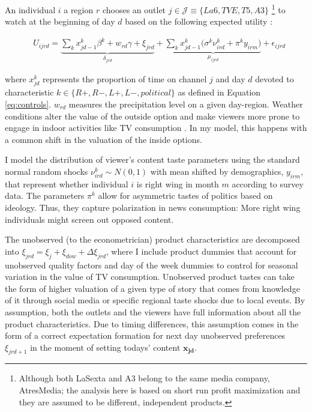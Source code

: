 \documentclass[12pt]{article}
\begin{document}
	An individual $ i $  a region $r$ chooses an outlet $ j \in \mathcal{J}\equiv \{La6,TVE,T5,A3\}$ \footnote{Although both LaSexta and A3 belong to the same media company, AtresMedia; the analysis here is based on short run profit maximization and they are assumed to be different, independent products. } to watch at the beginning of day $d$ based on the following expected utility : 
	
	
	\begin{equation}\label{eq:utility}
		\begin{aligned}
			& U_{ijrd}= \underbrace{\sum_k x_{jd-1}^k\beta^k+w_{rd}   \gamma  +  \xi_{jrd}}_{\delta_{jrd}}  + \underbrace{  \sum_k x_{jd-1}^k \Big( \sigma^k \nu_{ird}^k  + \pi^ky_{irm} \Big)}_{\mu_{ijrd}}+\epsilon_{ijrd} 
		\end{aligned}
	\end{equation} 
	
	where $ x_{jd}^k $ represents the  proportion of time on channel $ j $ and day $ d$ devoted to characteristic $ k \in \{R+,R-,L+,L-,political\}$ as defined in Equation \ref{eq:controls}. $w_{rd}$ measures the precipitation level on a given day-region. Weather conditions alter the value of the outside option and make viewers more prone to engage in indoor activities like TV consumption \citep{wilbur}. In my model, this happens with a common shift in the valuation of the inside options. 
	
	I model the distribution of viewer's content taste parameters using the standard normal random shocks $ \nu_{ird}^k \sim N(0,1)$ with mean shifted by  demographics, $ y_{irm} $, that represent whether individual $i$ is right wing in month $m$ according to survey data.	The parameters $\pi^k$ allow for asymmetric tastes of politics based on ideology. Thus, they capture polarization in news consumption: More right wing individuals might screen out opposed content. 

The unobserved (to the econometrician) product characteristics are decomposed into $\xi_{jrd}= \xi_j + \xi_{dow} + \Delta \xi_{jrd}$, where I include product dummies that account for unobserved quality factors and day of the week dummies to control for  seasonal variation in the value of TV consumption. Unobserved product tastes can take the form of higher valuation of a given type of story that comes from knowledge of it through social media or specific regional taste shocks due to local events. By assumption, both the outlets and the viewers have full information about all the product characteristics. Due to timing differences, this assumption comes in the form of a correct expectation formation for next day unobserved preferences $ \xi_{jrd+1}$ in the moment of setting todays' content $\bm{x_{jd}}$. 
	
\end{document}
